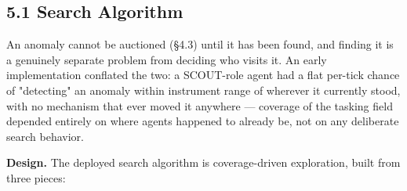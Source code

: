 \documentclass[conference]{IEEEtran}
\begin{document}
\subsection*{5.1 Search Algorithm}

An anomaly cannot be auctioned (\S4.3) until it has been found, and finding it is a genuinely separate problem from deciding who visits it. An early implementation conflated the two: a SCOUT-role agent had a flat per-tick chance of "detecting" an anomaly within instrument range of wherever it currently stood, with no mechanism that ever moved it anywhere --- coverage of the tasking field depended entirely on where agents happened to already be, not on any deliberate search behavior.

\textbf{Design.} The deployed search algorithm is coverage-driven exploration, built from three pieces:
\end{document}
